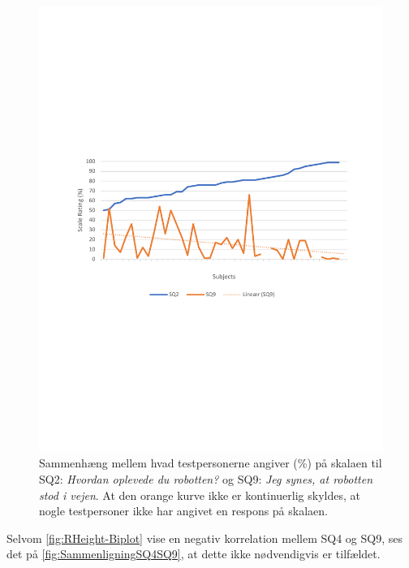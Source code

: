 \begin{figure}[H]
	\centering
	\includegraphics[width=\textwidth]{Figure/Korrelationsgrafer/SQ2+SQ9}
	\caption{Sammenhæng mellem hvad testpersonerne angiver (\%) på skalaen til SQ2: \textit{Hvordan oplevede du robotten?} og SQ9: \textit{Jeg synes, at robotten stod i vejen}. At den orange kurve ikke er kontinuerlig skyldes, at nogle testpersoner ikke har angivet en respons på skalaen.}
	\label{fig:SammenligningSQ2SQ9}
\end{figure}
\noindent
%
Selvom \autoref{fig:RHeight-Biplot} vise en negativ korrelation mellem SQ4 og SQ9, ses det på \autoref{fig:SammenligningSQ4SQ9}, at dette ikke nødvendigvis er tilfældet.
%
